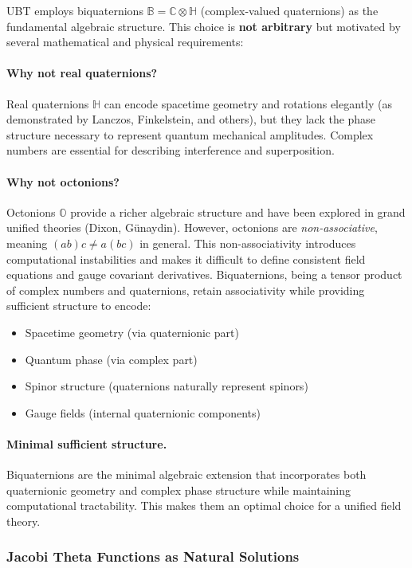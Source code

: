 UBT employs biquaternions $\mathbb{B} = \mathbb{C} \otimes \mathbb{H}$ (complex-valued quaternions) as the fundamental algebraic structure. This choice is \textbf{not arbitrary} but motivated by several mathematical and physical requirements:

\paragraph{Why not real quaternions?} Real quaternions $\mathbb{H}$ can encode spacetime geometry and rotations elegantly (as demonstrated by Lanczos, Finkelstein, and others), but they lack the phase structure necessary to represent quantum mechanical amplitudes. Complex numbers are essential for describing interference and superposition.

\paragraph{Why not octonions?} Octonions $\mathbb{O}$ provide a richer algebraic structure and have been explored in grand unified theories (Dixon, Günaydin). However, octonions are \emph{non-associative}, meaning $(ab)c \neq a(bc)$ in general. This non-associativity introduces computational instabilities and makes it difficult to define consistent field equations and gauge covariant derivatives. Biquaternions, being a tensor product of complex numbers and quaternions, retain associativity while providing sufficient structure to encode:
\begin{itemize}
\item Spacetime geometry (via quaternionic part)
\item Quantum phase (via complex part)
\item Spinor structure (quaternions naturally represent spinors)
\item Gauge fields (internal quaternionic components)
\end{itemize}

\paragraph{Minimal sufficient structure.} Biquaternions are the minimal algebraic extension that incorporates both quaternionic geometry and complex phase structure while maintaining computational tractability. This makes them an optimal choice for a unified field theory.

\subsubsection{Jacobi Theta Functions as Natural Solutions}

